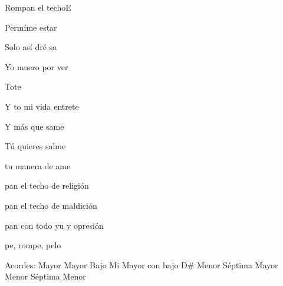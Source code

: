 \documentclass[12pt, spanish]{book}
\begin{document}
\begin{song}{Rompan el techo}{E}
        \begin{SBOpGroup}
            Permíme estar

            Solo así dré sa

            Yo muero por ver

            Tote

            Y to mi vida entrete

            Y más que same

            Tú quieres salme

             tu manera de ame
        \end{SBOpGroup}

        \begin{SBOpGroup}
            pan el techo de  religión

            pan el techo de  maldición

            pan con todo yu y opresión

            pe, rompe, pelo
        \end{SBOpGroup}

        \ifChordBk
        \begin{SBOpGroup}
            Acordes:\break
             Mayor \hfill
             Mayor Bajo Mi \hfill\null\break
             Mayor con bajo D\# \hfill
             Menor S\'eptima \hfill\null\break
             Mayor \hfill
             Menor S\'eptima \hfill\null\break
             Menor \hfill\null\break
        \end{SBOpGroup}
        \fi
    \end{song}
\end{document}
